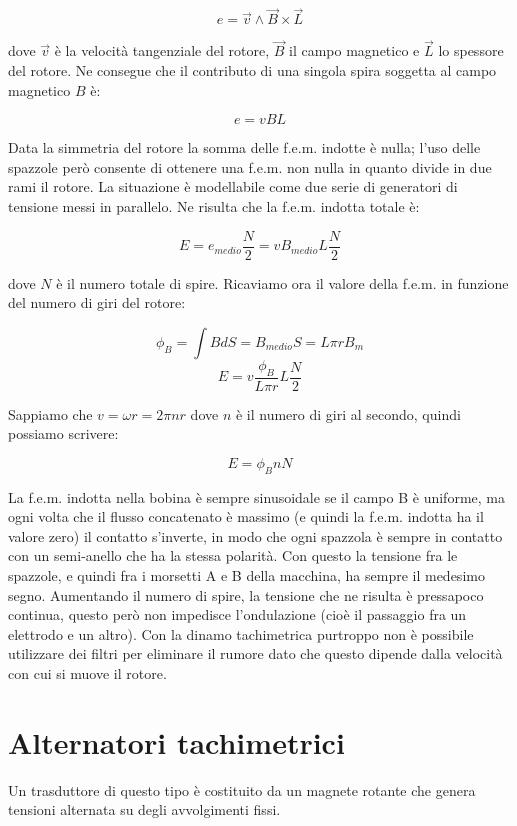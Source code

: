 	\[e = \overrightarrow{v} \wedge \overrightarrow{B} \times
\overrightarrow{L} \]

dove $\overrightarrow{v}$ è la velocità tangenziale del rotore,
$\overrightarrow{B}$ il campo magnetico e $\overrightarrow{L}$ lo
spessore del rotore. Ne consegue che il contributo di una singola
spira soggetta al campo magnetico $B$ è:

	\[e=vBL\]

Data la simmetria del rotore la somma delle f.e.m. indotte è nulla;
l'uso delle spazzole però consente di ottenere una f.e.m. non nulla
in quanto divide in due rami il rotore. La situazione è
modellabile come due serie di generatori di tensione messi in
parallelo. Ne risulta che la f.e.m. indotta totale è:

	\[E=e_{medio}\frac{N}{2}= vB_{medio}L\frac{N}{2}\]

dove $N$ è il numero totale di spire. Ricaviamo ora il valore della
f.e.m. in funzione del numero di giri del rotore:

	\[\phi_B=\int BdS=B_{medio}S=L\pi r B_m \]
	\[E=v\frac{\phi_B}{L \pi r}L\frac{N}{2}\]

Sappiamo che $v=\omega r= 2\pi n r$ dove $n$ è il numero di giri al
secondo, quindi possiamo scrivere:

	\[E=\phi_B n N\]

La f.e.m. indotta nella bobina è sempre sinusoidale se il campo B è
uniforme, ma ogni volta che il flusso concatenato è massimo (e quindi
la f.e.m. indotta ha il valore zero) il contatto s'inverte, in modo
che ogni spazzola è sempre in contatto con un semi-anello che ha la
stessa polarità. Con questo la tensione fra le spazzole, e quindi fra
i morsetti A e B della macchina, ha sempre il medesimo segno.
Aumentando il numero di spire, la tensione che ne risulta è pressapoco
continua, questo però non impedisce l'ondulazione (cioè il passaggio
fra un elettrodo e un altro). Con la dinamo tachimetrica purtroppo non
è possibile utilizzare dei filtri per eliminare il rumore dato che
questo dipende dalla velocità con cui si muove il rotore.

\section{Alternatori tachimetrici}
Un trasduttore di questo tipo è costituito da un magnete rotante che
genera tensioni alternata su degli avvolgimenti fissi.

